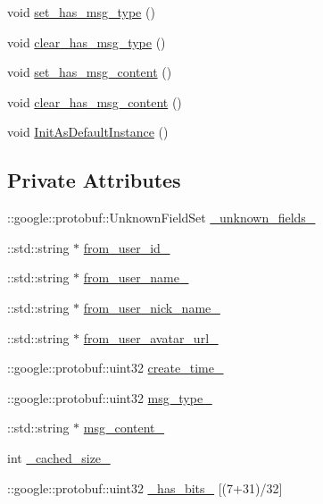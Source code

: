 \begin{DoxyCompactItemize}
\item 
void \hyperlink{class_i_m_1_1_base_define_1_1_client_msg_info_a846a27cf069bb69c2b17648e054a28b7}{set\+\_\+has\+\_\+msg\+\_\+type} ()
\item 
void \hyperlink{class_i_m_1_1_base_define_1_1_client_msg_info_ade2d57f1f6092a4aa5c3dc0098cf4121}{clear\+\_\+has\+\_\+msg\+\_\+type} ()
\item 
void \hyperlink{class_i_m_1_1_base_define_1_1_client_msg_info_aae23f069e2f341057421e987c4cd4db4}{set\+\_\+has\+\_\+msg\+\_\+content} ()
\item 
void \hyperlink{class_i_m_1_1_base_define_1_1_client_msg_info_ad0a4433b184e62c37b506a883cc25903}{clear\+\_\+has\+\_\+msg\+\_\+content} ()
\item 
void \hyperlink{class_i_m_1_1_base_define_1_1_client_msg_info_afcb610ac61d6b4028a33d4733518d1e4}{Init\+As\+Default\+Instance} ()
\end{DoxyCompactItemize}
\subsection*{Private Attributes}
\begin{DoxyCompactItemize}
\item 
\+::google\+::protobuf\+::\+Unknown\+Field\+Set \hyperlink{class_i_m_1_1_base_define_1_1_client_msg_info_aec44318fdc354bcdeb1b2f88b035805a}{\+\_\+unknown\+\_\+fields\+\_\+}
\item 
\+::std\+::string $\ast$ \hyperlink{class_i_m_1_1_base_define_1_1_client_msg_info_a7dfa717647a0a337c382fe8c3283916c}{from\+\_\+user\+\_\+id\+\_\+}
\item 
\+::std\+::string $\ast$ \hyperlink{class_i_m_1_1_base_define_1_1_client_msg_info_ad704d0958eee197e223e4d1beb95e040}{from\+\_\+user\+\_\+name\+\_\+}
\item 
\+::std\+::string $\ast$ \hyperlink{class_i_m_1_1_base_define_1_1_client_msg_info_a02f89adbcb0033bd21e2d33c823107e4}{from\+\_\+user\+\_\+nick\+\_\+name\+\_\+}
\item 
\+::std\+::string $\ast$ \hyperlink{class_i_m_1_1_base_define_1_1_client_msg_info_aebe81d9ba726fc1e87613c385e10e456}{from\+\_\+user\+\_\+avatar\+\_\+url\+\_\+}
\item 
\+::google\+::protobuf\+::uint32 \hyperlink{class_i_m_1_1_base_define_1_1_client_msg_info_a51172aecac5f6be44f30035b3e3ed637}{create\+\_\+time\+\_\+}
\item 
\+::google\+::protobuf\+::uint32 \hyperlink{class_i_m_1_1_base_define_1_1_client_msg_info_a65eb6948b9dcf595e7adebe3ebd1d3a0}{msg\+\_\+type\+\_\+}
\item 
\+::std\+::string $\ast$ \hyperlink{class_i_m_1_1_base_define_1_1_client_msg_info_a1990b0174b93220d027fbfa7ff559518}{msg\+\_\+content\+\_\+}
\item 
int \hyperlink{class_i_m_1_1_base_define_1_1_client_msg_info_a1ab5894a34f815a89624071ea48db0fc}{\+\_\+cached\+\_\+size\+\_\+}
\item 
\+::google\+::protobuf\+::uint32 \hyperlink{class_i_m_1_1_base_define_1_1_client_msg_info_aed30e01d982fd0c2d1cc3e76a0ed667d}{\+\_\+has\+\_\+bits\+\_\+} \mbox{[}(7+31)/32\mbox{]}
\end{DoxyCompactItemize}
